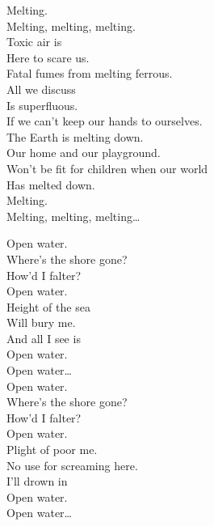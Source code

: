 Melting. \\
Melting, melting, melting. \\

Toxic air is \\
Here to scare us. \\
Fatal fumes from melting ferrous. \\
All we discuss \\
Is superfluous. \\
If we can't keep our hands to ourselves. \\

The Earth is melting down. \\
Our home and our playground. \\
Won't be fit for children when our world \\
Has melted down. \\

Melting. \\
Melting, melting, melting… \\





Open water. \\
Where's the shore gone? \\
How'd I falter? \\
Open water. \\

Height of the sea \\
Will bury me. \\
And all I see is \\
Open water. \\

Open water… \\

Open water. \\
Where's the shore gone? \\
How'd I falter? \\
Open water. \\

Plight of poor me. \\
No use for screaming here. \\
I'll drown in \\
Open water. \\

Open water… \\

